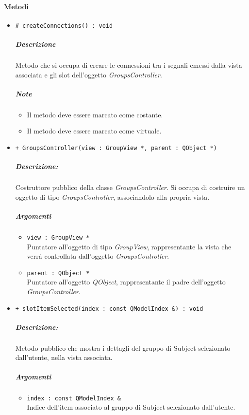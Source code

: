 	\paragraph{\color{black}Metodi}
		\begin{itemize}
			\item \color{blue} \verb!# createConnections() : void!
			\color{black}
			\subparagraph{Descrizione} Metodo che si occupa di creare le connessioni tra i segnali emessi dalla vista associata e gli slot\g{} dell'oggetto \textsl{GroupsController}.
			\subparagraph{Note}
			\begin{itemize}
				\item Il metodo deve essere marcato come costante.
				\item Il metodo deve essere marcato come virtuale.
			\end{itemize}
			\item \color{blue} \verb!+ GroupsController(view : GroupView *, parent : QObject *)!
			\color{black}
			\subparagraph{Descrizione:} Costruttore pubblico della classe \textsl{GroupsController}. Si occupa di costruire un oggetto di tipo \textsl{GroupsController}, associandolo alla propria vista.
			\color{black}
			\subparagraph{Argomenti}
			\begin{itemize}
				\item \color{RoyalPurple} \verb!view : GroupView *!\\				
\color{black} Puntatore all'oggetto di tipo \textsl{GroupView}, rappresentante la vista che verrà controllata dall'oggetto \textsl{GroupsController}.
				\item \color{RoyalPurple} \verb!parent : QObject *!\\				
\color{black} Puntatore all'oggetto \textsl{QObject}, rappresentante il padre dell'oggetto \textsl{GroupsController}.
			\end{itemize}
			\item \color{blue} \verb!+ slotItemSelected(index : const QModelIndex &) : void!
			\color{black}
			\subparagraph{Descrizione:} Metodo pubblico che mostra i dettagli del gruppo di Subject\g{} selezionato dall'utente, nella vista associata.
			\color{black}
			\subparagraph{Argomenti}
			\begin{itemize}
				\item \color{RoyalPurple} \verb!index : const QModelIndex &!\\				
\color{black} Indice dell'item associato al gruppo di Subject\g{} selezionato dall'utente.
			\end{itemize}

\end{itemize}
